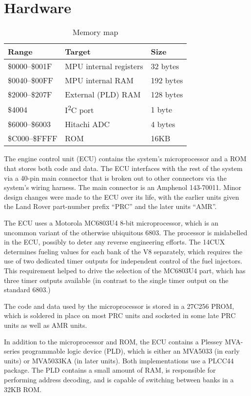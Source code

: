 \documentclass[11pt,twocolumn]{scrartcl}
\begin{document}
\section {Hardware}
 \begin{table*}
  \centering
  \begin{tabular}{|l|l|l|}
   \hline
   \bfseries{Range} & \bfseries{Target} & \bfseries{Size} \\ \hline
   \$0000--\$001F & MPU internal registers & 32 bytes \\ \hline
   \$0040--\$00FF & MPU internal RAM & 192 bytes \\      \hline
   \$2000--\$207F & External (PLD) RAM & 128 bytes \\    \hline
   \$4004 & I\textsuperscript{2}C port & 1 byte \\     \hline
   \$6000--\$6003 & Hitachi ADC & 4 bytes \\             \hline
   \$C000--\$FFFF & ROM & 16KB \\                       \hline
  \end{tabular}
  \caption{Memory map\label{tab:Memorymap}}
 \end{table*}
The engine control unit (ECU) contains the system's microprocessor and a ROM that stores both code and data. The ECU interfaces with the rest of the system via a 40-pin main connector that is broken out to other connectors via the system's wiring harness. The main connector is an Amphenol 143-70011. Minor design changes were made to the ECU over its life, with the earlier units given the Land Rover part-number prefix ``PRC'' and the later units ``AMR''.

The ECU uses a Motorola MC6803U4 8-bit microprocessor, which is an uncommon variant of the otherwise ubiquitous 6803. The processor is mislabelled in the ECU, possibly to deter any reverse engineering efforts. The 14CUX determines fueling values for each bank of the V8 separately, which requires the use of two dedicated timer outputs for independent control of the fuel injectors. This requirement helped to drive the selection of the MC6803U4 part, which has three timer outputs available (in contrast to the single timer output on the standard 6803.)

The code and data used by the microprocessor is stored in a 27C256 PROM, which is soldered in place on most PRC units and socketed in some late PRC units as well as AMR units.

In addition to the microprocessor and ROM, the ECU contains a Plessey MVA-series programmable logic device (PLD), which is either an MVA5033 (in early units) or MVA5033KA (in later units). Both implementations use a PLCC44 package. The PLD contains a small amount of RAM, is responsible for performing address decoding, and is capable of switching between banks in a 32KB ROM.
\end{document}
